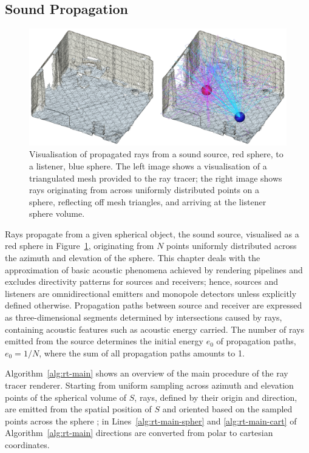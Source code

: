 \subsection{Sound Propagation}
\begin{figure}
    \centering
    \includegraphics[width=1\linewidth]{rt-room-test}
    \caption[Ray Tracing --- reflection diagram]{Visualisation of propagated rays from a sound source, red sphere, to a listener, blue sphere. The left image shows a visualisation of a triangulated mesh provided to the ray tracer; the right image shows rays originating from across uniformly distributed points on a sphere, reflecting off mesh triangles, and arriving at the listener sphere volume.}
    \label{fig:rt-room-demo}
\end{figure}
Rays propagate from a given spherical object, the sound source, visualised as a red sphere in Figure~\ref{fig:rt-room-demo}, originating from $N$ points uniformly distributed across the azimuth and elevation of the sphere. This chapter deals with the approximation of basic acoustic phenomena achieved by rendering pipelines and excludes directivity patterns for sources and receivers; hence, sources and listeners are omnidirectional emitters and monopole detectors unless explicitly defined otherwise. Propagation paths between source and receiver are expressed as three-dimensional segments determined by intersections caused by rays, containing acoustic features such as acoustic energy carried. The number of rays emitted from the source determines the initial energy $e_0$ of propagation paths, $e_0 = 1 / N$, where the sum of all propagation paths amounts to 1. \par
Algorithm~\ref{alg:rt-main} shows an overview of the main procedure of the ray tracer renderer. Starting from uniform sampling across azimuth and elevation points of the spherical volume of $S$, rays, defined by their origin and direction, are emitted from the spatial position of $S$ and oriented based on the sampled points across the sphere \citep{shirley2008realistic}; in Lines~\ref{alg:rt-main-spher} and \ref{alg:rt-main-cart} of Algorithm~\ref{alg:rt-main} directions are converted from polar to cartesian coordinates.\par


